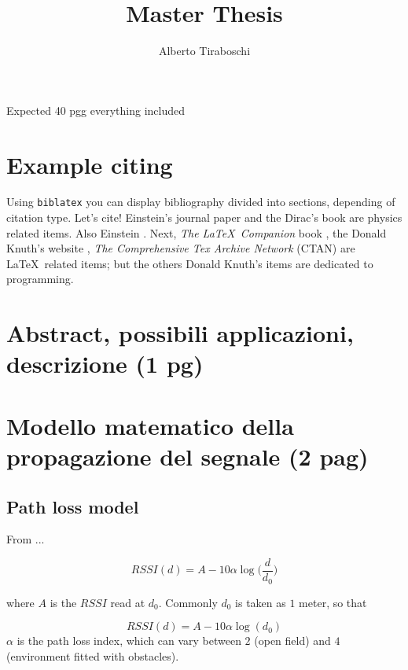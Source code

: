 \documentclass[12pt]{article}
\title{Master Thesis}
\author{Alberto Tiraboschi}
\begin{document}

\maketitle
\cleardoublepage

\tableofcontents
\cleardoublepage

Expected 40 pgg everything included
\section{Example citing}

Using \texttt{biblatex} you can display bibliography divided into sections, depending of citation type. 
Let's cite! Einstein's journal paper \cite{friis_m} and the Dirac's book \cite{dirac} are physics related items. Also Einstein \cite{einstein}. Next, \textit{The \LaTeX\ Companion} book \cite{latexcompanion}, the Donald Knuth's website \cite{knuthwebsite}, \textit{The Comprehensive Tex Archive Network} (CTAN) \cite{ctan} are \LaTeX\ related items; but the others Donald Knuth's items \cite{knuth-fa,knuth-acp} are dedicated to programming. 
\clearpage

\section{Abstract, possibili applicazioni, descrizione (1 pg)}
\clearpage

\section{Modello matematico della propagazione del segnale (2 pag)}
\subsection{Path loss model}
From \cite{friis_m}...

\begin{equation}
RSSI(d) = A-10\alpha\log\bigg(\frac{d}{d_0}\bigg)    
\end{equation}

where $A$ is the $RSSI$ read at $d_0$. Commonly $d_0$ is taken as $1$ meter, so that 

\begin{equation}
RSSI(d) = A-10\alpha\log(d_0)    
\end{equation}
$\alpha$ is the path loss index, which can vary between $2$ (open field) and $4$ (environment fitted with obstacles).
\clearpage
\end{document}
